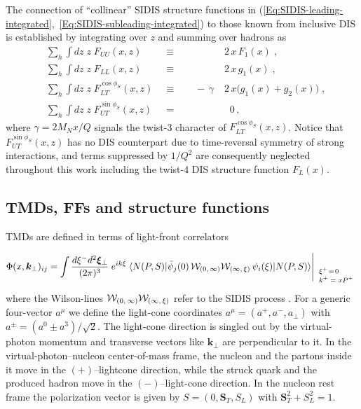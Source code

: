 \documentclass[a4paper,11pt]{article}
\newcommand{\be}{\begin{equation}}
\newcommand{\ee}{\end{equation}}
\newcommand{\la}{\langle}
\newcommand{\ra}{\rangle}
\newcommand{\with}[3]{{\Biggl|{\renewcommand*{\arraystretch}{0.8}
	\begin{array}{l}
	\phantom{X}\\
	\mbox{\scriptsize ${#1}$}\\
	\mbox{\scriptsize ${#2}$}\\
	\mbox{\scriptsize #3}\end{array}}}}
\def\bfkperp{{\bm k}_\perp}
\begin{document}
The connection of ``collinear'' SIDIS structure functions
in (\ref{Eq:SIDIS-leading-integrated},~\ref{Eq:SIDIS-subleading-integrated})
to those known from inclusive DIS is established by integrating over $z$
and summing over hadrons as
\begin{subequations}\begin{alignat}{4}
	&\sum\limits_h\int d z\;z\;F_{UU}(x,z)
	&\equiv	&&	& 2\,x\,F_1(x) \;,
	\label{Eq:DIS-F1}\\ %
	&\sum\limits_h\int d z\;z\;F_{LL}(x,z)
	&\equiv && 	& 2\,x\,g_1(x) \;,
	\label{Eq:DIS-g1}\\ %
	&\sum\limits_h\int d z\;z\;F_{LT}^{\cos\phi_S}(x,z) \;\;
	&\equiv && \;\; -\,\gamma\; & 2\,x\biggl(g_1(x)+g_2(x)\biggr) \;,
	\label{Eq:DIS-gT}\\ %
	&\sum\limits_h\int d z\;z\;F_{UT}^{\sin\phi_S}(x,z)
	&=      && 	    & \;\; 0 \, ,
	\label{Eq:DIS-zero}
\end{alignat}\end{subequations}
where $\gamma=2M_Nx/Q$ signals the twist-3 character of $F_{LT}^{\cos\phi_S}(x,z)$.
Notice that $F_{UT}^{\sin\phi_S}(x,z)$ has no DIS counterpart due to time-reversal
symmetry of strong interactions, and terms suppressed by $1/Q^2$ are
consequently neglected throughout this work including the twist-4 DIS
structure function $F_L(x)$.


\subsection{TMDs, FFs and structure functions}
\label{Sec-2.2:def-TMD-FF}

TMDs are defined in terms of light-front correlators
\be\label{Eq:correlator}
    	\Phi(x,\bfkperp)_{ij} = \int\frac{ d \xi^- d^2{\bm \xi}_\perp}{(2\pi)^3}
	\;e^{ik\xi}\;\la N(P,S)|\bar\psi_j(0)\,{\cal W}_{(0,\,\infty)}
	{\cal W}_{(\infty,\,\xi)}\,\psi_i(\xi)|N(P,S)\ra
    	\with{ }{\xi^+\!=\!0}{$k^+ = xP^+$}
	\ee
where the Wilson-lines  {${\cal W}_{(0,\,\infty)}{\cal W}_{(\infty,\,\xi)}$}
refer to the SIDIS process
\cite{Collins:2002kn}. For a generic four-vector $a^\mu$ we define
the light-cone coordinates $a^\mu=(a^+,a^-,a_\perp)$ with
$a^\pm=(a^0\pm a^3)/\sqrt{2}$.
The light-cone direction is singled out by the virtual-photon momentum
and transverse vectors like $\bfkperp$ are perpendicular to it. In the
virtual-photon--nucleon center-of-mass frame, the nucleon and the partons
inside it move in the $(+)$--lightcone direction, while the struck
quark and the produced hadron move in the $(-)$--light-cone direction.
In the nucleon rest frame the polarization vector is given by
$S=(0,{\bm S}_T,S_L)$ with ${\bm S}_T^2+S_L^2=1$.
\end{document}
